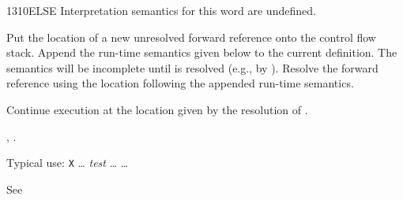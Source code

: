 \begin{worddef}{1310}{ELSE}
\interpret
	Interpretation semantics for this word are undefined.

\compile

	Put the location of a new unresolved forward reference
	 onto the control flow stack. Append the run-time
	semantics given below to the current definition. The semantics
	will be incomplete until  is resolved (e.g., by
	). Resolve the forward reference  using
	the location following the appended run-time semantics.

\runtime
	\stack{}{}

	Continue execution at the location given by the resolution of
	.

\see {},
	.

	\begin{defer}
	\rationale %
		Typical use:
			\word{:} \texttt{X} {\ldots}
				\emph{test}  {\ldots}
				 {\ldots} 
			\word{;}

	\testing\rmfamily
		See 
	\end{defer}
\end{worddef}


